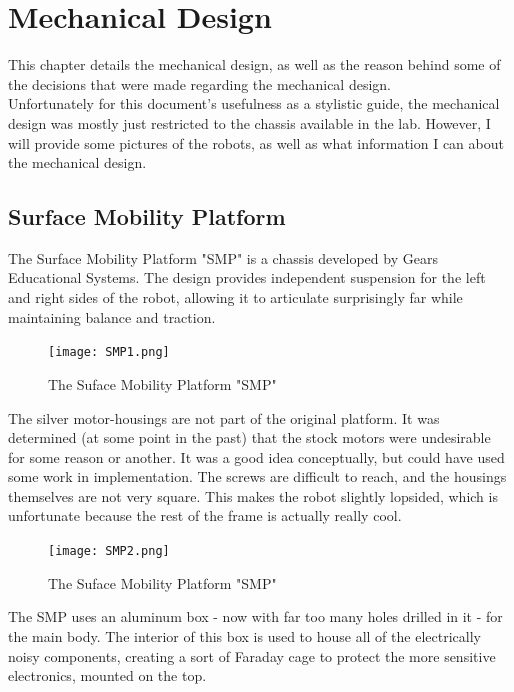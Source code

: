 
\chapter{Mechanical Design}
\label{chap:mechdesign}

This chapter details the mechanical design, as well as the reason behind some of the decisions that were made regarding the mechanical design.\\

Unfortunately for this document's usefulness as a stylistic guide, the mechanical design was mostly just restricted to the chassis available in the lab. However, I will provide some pictures of the robots, as well as what information I can about the mechanical design.

\section{Surface Mobility Platform}

The Surface Mobility Platform "SMP" is a chassis developed by Gears Educational Systems. The design provides independent suspension for the left and right sides of the robot, allowing it to articulate surprisingly far while maintaining balance and traction.

\begin{figure}[h]
\centering
\texttt{[image: SMP1.png]}
\label{fig:smp1}
\caption{The Suface Mobility Platform "SMP"}
\end{figure}

The silver motor-housings are not part of the original platform. It was determined (at some point in the past) that the stock motors were undesirable for some reason or another. It was a good idea conceptually, but could have used some work in implementation. The screws are difficult to reach, and the housings themselves are not very square. This makes the robot slightly lopsided, which is unfortunate because the rest of the frame is actually really cool.

\begin{figure}[h]
\centering
\texttt{[image: SMP2.png]}
\label{fig:smp2}
\caption{The Suface Mobility Platform "SMP"}
\end{figure}

The SMP uses an aluminum box - now with far too many holes drilled in it - for the main body. The interior of this box is used to house all of the electrically noisy components, creating a sort of Faraday cage to protect the more sensitive electronics, mounted on the top.


